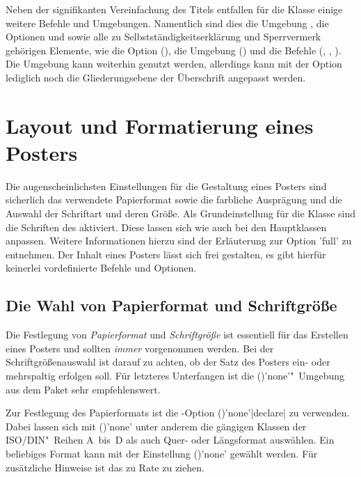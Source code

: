 \begin{Bundle*}[v2.05]{}
Neben der signifikanten Vereinfachung des Titels entfallen für die Klasse 
 einige weitere Befehle und Umgebungen. Namentlich sind 
dies die Umgebung , die Optionen  
und  sowie alle zu Selbstständigkeitserklärung und 
Sperrvermerk gehörigen Elemente, wie die Option (), die 
Umgebung () und die Befehle (, 
, ). Die Umgebung  
kann weiterhin genutzt werden, allerdings kann mit der Option  
lediglich noch die Gliederungsebene der Überschrift angepasst werden.

\section{Layout und Formatierung eines Posters}
%
Die augenscheinlichsten Einstellungen für die Gestaltung eines Posters sind 
sicherlich das verwendete Papierformat sowie die farbliche Ausprägung und die 
Auswahl der Schriftart und deren Größe. Als Grundeinstellung für die Klasse
 sind die Schriften des \TUDCDs aktiviert. Diese lassen 
sich wie auch bei den Hauptklassen anpassen. Weitere Informationen hierzu sind 
der Erläuterung zur Option 'full' zu entnehmen. Der Inhalt eines 
Posters lässt sich frei gestalten, es gibt hierfür keinerlei vordefinierte 
Befehle und Optionen. 
 


\subsection{Die Wahl von Papierformat und Schriftgröße}
%
%
%

Die Festlegung von \emph{Papierformat} und \emph{Schriftgröße} ist essentiell 
für das Erstellen eines Posters und sollten \emph{immer} vorgenommen werden. 
Bei der Schriftgrößenauswahl ist darauf zu achten, ob der Satz des Posters 
ein- oder mehrspaltig erfolgen soll. Für letzteres Unterfangen ist die 
()'none'"~Umgebung aus dem Paket 
 sehr empfehlenswert. 

Zur Festlegung des Papierformats ist die \KOMAScript-Option 
()'none'|declare| zu verwenden. Dabei 
lassen sich mit ()'none' 
unter anderem die gängigen Klassen der ISO/DIN"~Reihen A~bis~D als auch Quer- 
oder Längsformat auswählen. Ein beliebiges Format kann mit der Einstellung
()'none'
gewählt werden. Für zusätzliche Hinweise ist das \scrguide zu Rate zu ziehen.


\end{Bundle*}
